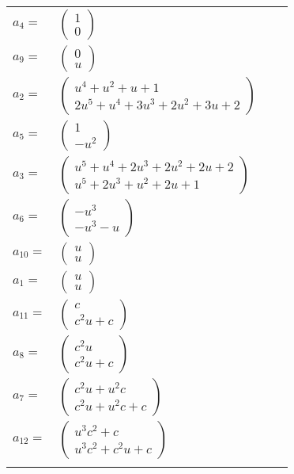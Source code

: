 \documentclass[1p]{elsarticle_modified}
\theoremstyle{definition}
\begin{document}
\begin{tabular}{m{7pt} m{180pt} m{7pt} m{180pt} }
\flushright $a_{4}=$&$\begin{pmatrix}1\\0\end{pmatrix}$ \\
\flushright $a_{9}=$&$\begin{pmatrix}0\\u\end{pmatrix}$ \\
\flushright $a_{2}=$&$\begin{pmatrix}u^4+u^2+u+1\\2 u^5+u^4+3 u^3+2 u^2+3 u+2\end{pmatrix}$ \\
\flushright $a_{5}=$&$\begin{pmatrix}1\\- u^2\end{pmatrix}$ \\
\flushright $a_{3}=$&$\begin{pmatrix}u^5+u^4+2 u^3+2 u^2+2 u+2\\u^5+2 u^3+u^2+2 u+1\end{pmatrix}$ \\
\flushright $a_{6}=$&$\begin{pmatrix}- u^3\\- u^3- u\end{pmatrix}$ \\
\flushright $a_{10}=$&$\begin{pmatrix}u\\u\end{pmatrix}$ \\
\flushright $a_{1}=$&$\begin{pmatrix}u\\u\end{pmatrix}$ \\
\flushright $a_{11}=$&$\begin{pmatrix}c\\c^2 u+c\end{pmatrix}$ \\
\flushright $a_{8}=$&$\begin{pmatrix}c^2 u\\c^2 u+c\end{pmatrix}$ \\
\flushright $a_{7}=$&$\begin{pmatrix}c^2 u+u^2 c\\c^2 u+u^2 c+c\end{pmatrix}$ \\
\flushright $a_{12}=$&$\begin{pmatrix}u^3 c^2+c\\u^3 c^2+c^2 u+c\end{pmatrix}$\\&\end{tabular}
\end{document}
